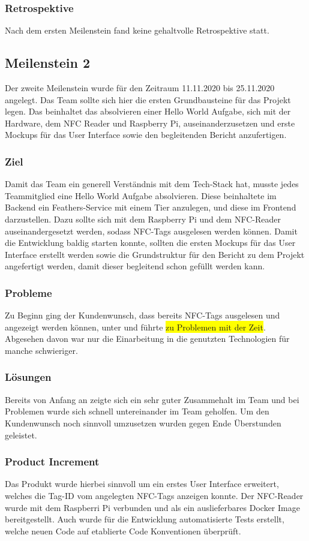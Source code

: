 \documentclass[10pt, a4paper, draft]{article}
\begin{document}
\subsubsection{Retrospektive}
Nach dem ersten Meilenstein fand keine gehaltvolle Retrospektive statt.

\subsection{Meilenstein 2}
Der zweite Meilenstein wurde für den Zeitraum 11.11.2020 bis 25.11.2020 angelegt.
Das Team sollte sich hier die ersten Grundbausteine für das Projekt legen.
Das beinhaltet das absolvieren einer Hello World Aufgabe, sich mit der Hardware, dem NFC Reader und Raspberry Pi, auseinanderzusetzen und erste Mockups für das User Interface sowie den begleitenden Bericht anzufertigen.
\subsubsection{Ziel}
Damit das Team ein generell Verständnis mit dem Tech-Stack hat, musste jedes Teammitglied eine Hello World Aufgabe absolvieren. Diese beinhaltete im Backend ein Feathers-Service mit einem Tier anzulegen, und diese im Frontend darzustellen.
Dazu sollte sich mit dem Raspberry Pi und dem NFC-Reader auseinandergesetzt werden, sodass NFC-Tags ausgelesen werden können.
Damit die Entwicklung baldig starten konnte, sollten die ersten Mockups für das User Interface erstellt werden sowie die Grundstruktur für den Bericht zu dem Projekt angefertigt werden, damit dieser begleitend schon gefüllt werden kann.
\subsubsection{Probleme}
Zu Beginn ging der Kundenwunsch, dass bereits NFC-Tags ausgelesen und angezeigt werden können, unter und führte \colorbox{yellow}{zu Problemen mit der Zeit}.
Abgesehen davon war nur die Einarbeitung in die genutzten Technologien für manche schwieriger.
\subsubsection{Lösungen}
Bereits von Anfang an zeigte sich ein sehr guter Zusammehalt im Team und bei Problemen wurde sich schnell untereinander im Team geholfen.
Um den Kundenwunsch noch sinnvoll umzusetzen wurden gegen Ende Überstunden geleistet.
\subsubsection{Product Increment}
Das Produkt wurde hierbei sinnvoll um ein erstes User Interface erweitert, welches die Tag-ID vom angelegten NFC-Tags anzeigen konnte.
Der NFC-Reader wurde mit dem Raspberri Pi verbunden und als ein auslieferbares Docker Image bereitgestellt.
Auch wurde für die Entwicklung automatisierte Tests erstellt, welche neuen Code auf etablierte Code Konventionen überprüft.
\end{document}
